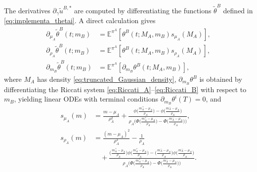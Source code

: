 \documentclass[letterpaper, 10 pt, conference]{ieeeconf}
\newcommand{\E}{\mathbb E}
\begin{document}
The derivatives $\partial_{\gamma} \widetilde{u}^{B,*}$ are computed by differentiating the functions \(\widetilde\theta^B\) defined in \eqref{eq:implementa_thetai}. A direct calculation gives
\begin{align}
    \partial_{\mu_A} \widetilde{\theta}^B(t; m_B) &= \E^{\pi^A}[\theta^B(t;M_A, m_B) s_{\mu_A}(M_A)], \nonumber\\
    \partial_{\rho_A} \widetilde{\theta}^B(t; m_B) &= \E^{\pi^A}[\theta^B(t;M_A, m_B) s_{\rho_A}(M_A)], \label{eq:thetaBunderprior}\\
    \partial_{m_B} \widetilde{\theta}^B(t; m_B) &= \E^{\pi^A}[\partial_{m_B} \theta^B(t; M_A, m_B)], \nonumber
\end{align}
where $M_A$ has density \eqref{eq:truncated_Gaussian_density}, $\partial_{m_B}\theta^B$ is obtained by differentiating the Riccati system \eqref{eq:Riccati_A}--\eqref{eq:Riccati_B} with respect to $m_B$, yielding linear ODEs with terminal conditions $\partial_{m_B}\theta^i(T) = 0$, and
\begin{equation}\label{eq:score_functions}
\begin{aligned}
    s_{\mu_A}(m) &= \frac{m-\mu_A}{\rho_A^2} + \frac{\phi\big(\tfrac{m_A^+-\mu_A}{\rho_A}\big) - \phi\big(\frac{m_A^--\mu_A}{\rho_A}\big)}{\rho_A\big(\Phi\big(\tfrac{m_A^+-\mu_A}{\rho_A}\big) - \Phi\big(\tfrac{m_A^--\mu_A}{\rho_A}\big)\big)},\\
    s_{\rho_A}(m) &= \tfrac{(m-\mu_A)^2}{\rho_A^3} -\tfrac{1}{\rho_A} \\
    & \quad + \tfrac{\big(\tfrac{m_A^+ -\mu_A}{\rho_A}\big)\phi\big(\tfrac{m_A^+ -\mu_A}{\rho_A}\big) - \big(\tfrac{m_A^- -\mu_A}{\rho_A}\big)\phi\big(\tfrac{m_A^- -\mu_A}{\rho_A}\big)}{\rho_A\big(\Phi\big(\tfrac{m_A^+ -\mu_A}{\rho_A}\big) - \Phi\big(\tfrac{m_A^- -\mu_A}{\rho_A}\big)\big)}.
\end{aligned}
\end{equation}
\end{document}
